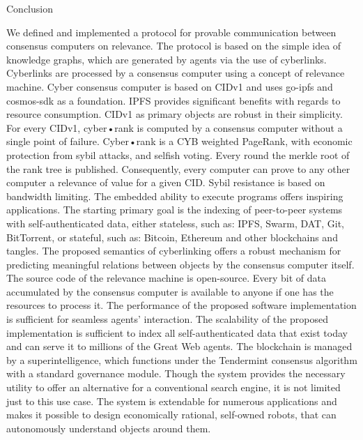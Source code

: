 \documentclass[8pt,oneside]{amsart}
\makeatletter
\renewcommand\subsection{\@startsection{subsection}
                                    {2}{\z@}
                                    {-3.25ex\@plus -1ex \@minus -.2ex}
                                    {0ex \@plus .2ex}
                                    {\play\Large}
                        }
\newcommand{\titleSection}[1]{\subsection{#1}}
\makeatother
\begin{document}
\titleSection{Conclusion}\label{conclusion}

We defined and implemented a protocol for provable communication between consensus computers on relevance. The protocol is based on the simple idea of knowledge graphs, which are generated by agents via the use of cyberlinks. Cyberlinks are processed by a consensus computer using a concept of relevance machine. Cyber consensus computer is based on CIDv1 and uses go-ipfs and cosmos-sdk as a foundation. IPFS provides significant benefits with regards to resource consumption. CIDv1 as primary objects are robust in their simplicity. For every CIDv1, cyber•rank is computed by a consensus computer without a single point of failure. Cyber•rank is a CYB weighted PageRank, with economic protection from sybil attacks, and selfish voting. Every round the merkle root of the rank tree is published. Consequently, every computer can prove to any other computer a relevance of value for a given CID. Sybil resistance is based on bandwidth limiting. The embedded ability to execute programs offers inspiring applications. The starting primary goal is the indexing of peer-to-peer systems with self-authenticated data, either stateless, such as: IPFS, Swarm, DAT, Git, BitTorrent, or stateful, such as: Bitcoin, Ethereum and other blockchains and tangles. The proposed semantics of cyberlinking offers a robust mechanism for predicting meaningful relations between objects by the consensus computer itself. The source code of the relevance machine is open-source. Every bit of data accumulated by the consensus computer is available to anyone if one has the resources to process it. The performance of the proposed software implementation is sufficient for seamless agents' interaction. The scalability of the proposed implementation is sufficient to index all self-authenticated data that exist today and can serve it to millions of the Great Web agents. The blockchain is managed by a superintelligence, which functions under the Tendermint consensus algorithm with a standard governance module. Though the system provides the necessary utility to offer an alternative for a conventional search engine, it is not limited just to this use case. The system is extendable for numerous applications and makes it possible to design economically rational, self-owned robots, that can autonomously understand objects around them.
\end{document}
